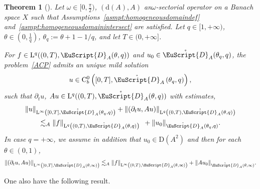 \documentclass[10pt]{amsart}
\newtheorem{theo}{Theorem}[section]
\theoremstyle{definition}\newtheorem{defi}[theo]{Definition}\newtheorem{rema}[theo]{Remark}\newtheorem{exam}[theo]{Example}\newtheorem{exem}[theo]{Example}\newtheorem{nota}[theo]{Notation}
\newcommand{\rmd}{\mathrm{d}}
\newcommand{\rmD}{\mathrm{D}}
\newcommand{\rmL}{\mathrm{L}}
\newcommand{\rmC}{\mathrm{C}}
\newcommand{\rgeusD}{\mathring{\eus{D}}}
\newcommand{\eus}{\EuScript}
\begin{document}
\begin{theo}[{\cite[Theorem~2.20]{DanchinHieberMuchaTolk2020}}] \label{thm:DaPratoGrisvardHom2020}
Let $\omega\in [0,\frac{\pi}{2})$, $(\rmd(A),A)$ an\linebreak $\omega$-sectorial operator on a Banach space $X$ such that Assumptions~\ref{asmpt:homogeneousdomaindef} and~\ref{asmpt:homogeneousdomainintersect} are satisfied. Let $q\in [1,+\infty)$, $\theta\in(0,\tfrac{1}{q})$, $\theta_q:= \theta +1-1/q$, and let $T\in(0,+\infty]$.

For $f\in \rmL^q((0,T),{\eus{D}}_{A}(\theta,q))$ and $u_0\in \rgeusD_{A}(\theta_q,q)$, the problem~\eqref{ACP} admits an unique mild solution
\begin{align*}
u\in \rmC ^0_{b}\left([0,T],\rgeusD_{A}\left(\theta_q,q\right)\right),
\end{align*}
such that $\partial_t u$, $Au\in \rmL^q((0,T),\rgeusD_{A}(\theta,q))$ with estimates,
\begin{multline} \label{estimateLqMaxRegDaPratoGrisvardHom}
\| u\|_{\rmL^\infty\left([0,T],\rgeusD_{A}(\theta_q,q)\right)} + \left\|\left(\partial_t u, Au\right)\right\|_{\rmL^q\left((0,T),\rgeusD_{A}(\theta,q)\right)}\\
\lesssim_{A}\| f\|_{\rmL^q\left((0,T),\rgeusD_{A}(\theta,q)\right)}\;\: + \| u_0\|_{\rgeusD_{A}(\theta_q,q)}.
\end{multline}
In case $q=+\infty$, we assume in addition that $u_0\in \rmD(A^2)$ and then for each $\theta\in (0,1)$,
\begin{align}
\left\| (\partial_t u, Au)\right\|_{\rmL^\infty\left([0,T],\rgeusD_{A}(\theta,\infty)\right)} \lesssim_{A} \| f\|_{\rmL^\infty\left((0,T),{\eus{D}}_{A}(\theta,\infty)\right)} + \| A u_0\|_{\rgeusD_{A}(\theta,\infty)}.
\end{align}
\end{theo}

One also have the following result.
\end{document}
